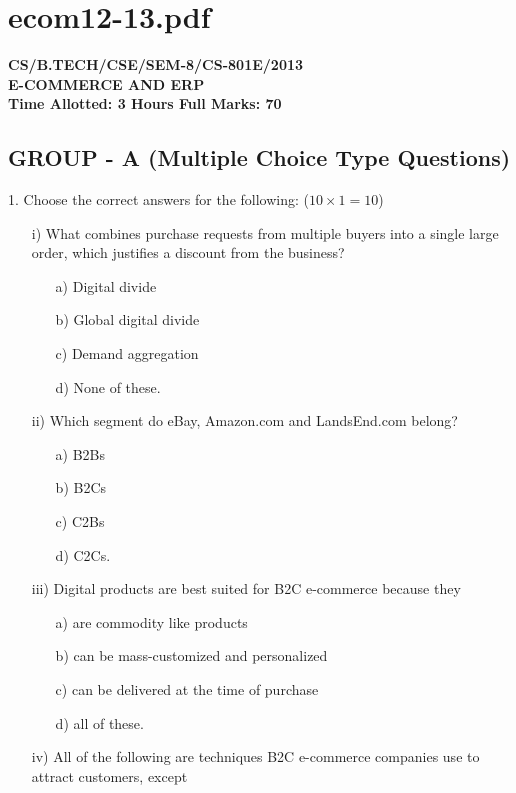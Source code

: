 \newpage
\section*{ecom12-13.pdf}
\textbf{CS/B.TECH/CSE/SEM-8/CS-801E/2013} \\
\textbf{E-COMMERCE AND ERP} \\
\textbf{Time Allotted: 3 Hours \hfill Full Marks: 70}

\subsection*{GROUP - A (Multiple Choice Type Questions)}
1. Choose the correct answers for the following: ($10 \times 1 = 10$)
\begin{enumerate}
    \item[i)] What combines purchase requests from multiple buyers into a single large order, which justifies a discount from the business?
    \begin{enumerate}
        \item[a)] Digital divide
        \item[b)] Global digital divide
        \item[c)] Demand aggregation
        \item[d)] None of these.
    \end{enumerate}
    \item[ii)] Which segment do eBay, Amazon.com and LandsEnd.com belong?
    \begin{enumerate}
        \item[a)] B2Bs
        \item[b)] B2Cs
        \item[c)] C2Bs
        \item[d)] C2Cs.
    \end{enumerate}
    \item[iii)] Digital products are best suited for B2C e-commerce because they
    \begin{enumerate}
        \item[a)] are commodity like products
        \item[b)] can be mass-customized and personalized
        \item[c)] can be delivered at the time of purchase
        \item[d)] all of these.
    \end{enumerate}
    \item[iv)] All of the following are techniques B2C e-commerce companies use to attract customers, except

\end{enumerate}
